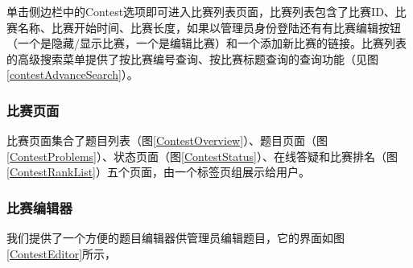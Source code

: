 单击侧边栏中的Contest选项即可进入比赛列表页面，比赛列表包含了比赛ID、比赛名称、比赛开始时间、比赛长度，如果以管理员身份登陆还有有比赛编辑按钮（一个是隐藏/显示比赛，一个是编辑比赛）和一个添加新比赛的链接。比赛列表的高级搜索菜单提供了按比赛编号查询、按比赛标题查询的查询功能（见图\ref{contestAdvanceSearch}）。

\subsubsection{比赛页面}
比赛页面集合了题目列表（图\ref{ContestOverview}）、题目页面（图\ref{ContestProblems}）、状态页面（图\ref{ContestStatus}）、在线答疑和比赛排名（图\ref{ContestRankList}）五个页面，由一个标签页组展示给用户。


\subsubsection{比赛编辑器}
我们提供了一个方便的题目编辑器供管理员编辑题目，它的界面如图\ref{ContestEditor}所示，

